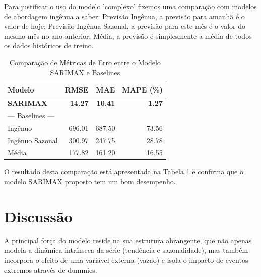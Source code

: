\documentclass[ 12pt,a4paper ]{article} %
\begin{document}
		Para justificar o uso do modelo 'complexo' fizemos uma comparação com modelos de abordagem ingênua a saber: Previsão Ingênua, a previsão para amanhã é o valor de hoje; Previsão Ingênua Sazonal, a previsão para este mês é o valor do mesmo mês no ano anterior; Média, a previsão é simplesmente a média de todos os dados históricos de treino.
		
	\begin{table}[htbp]
		\centering
		\caption{Comparação de Métricas de Erro entre o Modelo SARIMAX e Baselines}
		\label{tab:model_comparison}
		\begin{tabular}{lrrr}
			\toprule
			\textbf{Modelo} & \textbf{RMSE} & \textbf{MAE} & \textbf{MAPE (\%)} \\
			\midrule
			\textbf{SARIMAX} & \textbf{14.27} & \textbf{10.41} & \textbf{1.27} \\
			\addlinespace %
			--- Baselines --- & & & \\
			\addlinespace
			Ingênuo & 696.01 & 687.50 & 73.56 \\
			Ingênuo Sazonal & 300.97 & 247.75 & 28.78 \\
			Média & 177.82 & 161.20 & 16.55 \\
			\bottomrule
		\end{tabular}
	\end{table}
	

	
	O resultado desta comparação está apresentada na Tabela \ref{tab:model_comparison} e confirma que o modelo SARIMAX proposto tem um bom desempenho.
	
	
	
	
	\section{Discussão}
	A principal força do modelo reside na sua estrutura abrangente, que não apenas modela a dinâmica intrínseca da série (tendência e sazonalidade), mas também incorpora o efeito de uma variável externa (vazao) e isola o impacto de eventos extremos através de dummies.
	
\end{document}
